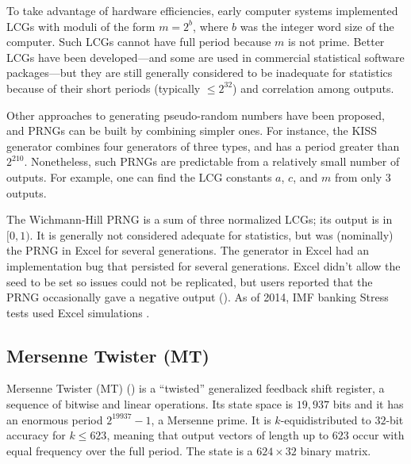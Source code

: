 \documentclass[graybox]{svmult}
\begin{document}
To take advantage of hardware efficiencies, early computer systems implemented LCGs 
with moduli of the form 
$m = 2^b$, where
$b$ was the integer word size of the computer.
Such LCGs cannot have full period because $m$ is not prime. 
Better LCGs have been developed---and some are used in commercial statistical software packages---but they are still
generally considered to be inadequate for statistics because of their short periods (typically $ \le 2^{32}$) 
and correlation among outputs.

Other approaches to generating pseudo-random numbers have been
proposed, and PRNGs can be built by combining simpler ones.
For instance, the KISS generator combines four generators of three types, and has a period greater than $2^{210}$.
Nonetheless, such PRNGs are predictable from a relatively small number of outputs.
For example, one can find the LCG constants $a$, $c$, and $m$ from only 3 outputs.

The Wichmann-Hill PRNG is a sum of three normalized LCGs; its output is in $[0, 1)$.
%
It is generally not considered adequate for statistics, but was (nominally) the PRNG in Excel for several generations. 
The generator in Excel had an implementation bug that persisted for several generations.
Excel didn't allow the seed to be set so issues could not be replicated, but users reported that the PRNG occasionally gave a negative output (\cite{mccullough_microsoft_2008}).
As of 2014, IMF banking Stress tests used Excel simulations \cite{ong14}.

\subsection{Mersenne Twister (MT)}

Mersenne Twister (MT) (\cite{matsumoto_mersenne_1998}) is a ``twisted'' generalized feedback shift register, a sequence of bitwise and linear operations.
Its state space is $19,937$ bits and it has an enormous period $2^{19937}-1$, a Mersenne prime.
It is $k$-equidistributed to $32$-bit accuracy for $k \leq 623$, 
meaning that output vectors of length up to $623$ occur with equal frequency over the full period.
The state is a $624 \times 32$ binary matrix.
\end{document}
